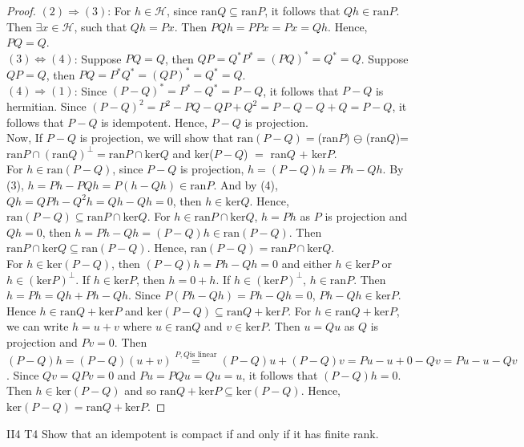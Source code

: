 \begin{proof}
    $(2)\Rightarrow (3)$: 
    For $h\in\mathscr{H}$, since $\text{ran}Q\subseteq \text{ran}P$, 
    it follows that $Qh\in\text{ran}P$. Then $\exists x\in \mathscr{H}$, such that $Qh=Px$.
    Then $PQh=PPx=Px=Qh$. Hence, $PQ=Q$.\\
    $(3)\Leftrightarrow (4)$:
    Suppose $PQ=Q$, then $QP=Q^*P^*=(PQ)^*=Q^*=Q$. 
    Suppose $QP=Q$, then $PQ=P^*Q^*=(QP)^*=Q^*=Q$.\\
    $(4)\Rightarrow (1)$:
    Since $(P-Q)^*=P^*-Q^*=P-Q$, it follows that $P-Q$ is hermitian.
    Since $(P-Q)^2=P^2-PQ-QP+Q^2=P-Q-Q+Q=P-Q$, it follows that $P-Q$ is idempotent.
    Hence, $P-Q$ is projection.\\
    Now, If $P-Q$ is projection, we will show that $\text{ran}(P-Q)=$(ran$P$) $\ominus$ (ran$Q$)=$\text{ran}P\cap (\text{ran}Q)^{\perp}=\text{ran}P\cap \text{ker}Q$
    and ker($P-Q$) $=$ ran$Q$ $+$ ker$P$.\\
    For $h\in \text{ran}(P-Q)$, since $P-Q$ is projection, $h=(P-Q)h=Ph-Qh$.
    By (3), $h=Ph-PQh=P(h-Qh)\in\text{ran}P$. And by (4), $Qh=QPh-Q^2h=Qh-Qh=0$, then $h\in\text{ker}Q$.
    Hence, $\text{ran}(P-Q)\subseteq \text{ran}P\cap \text{ker}Q$.
    For $h\in \text{ran}P\cap \text{ker}Q$, $h=Ph$ as $P$ is projection 
    and $Qh=0$, then $h=Ph-Qh=(P-Q)h\in\text{ran}(P-Q)$. Then $\text{ran}P\cap \text{ker}Q\subseteq \text{ran}(P-Q)$.
    Hence, $\text{ran}(P-Q)=\text{ran}P\cap \text{ker}Q$.\\
    For $h\in\text{ker}(P-Q)$, 
    then $(P-Q)h=Ph-Qh=0$ and either $h\in\text{ker}P$ or $h\in (\text{ker}P)^{\perp}$.
    If $h\in \text{ker}P$, then $h=0+h$. If $h\in (\text{ker}P)^{\perp}$, $h\in \text{ran}P$.
    Then $h=Ph=Qh+Ph-Qh$. Since $P(Ph-Qh)=Ph-Qh=0$, $Ph-Qh\in\text{ker}P$.
    Hence $h\in\text{ran}Q+\text{ker}P$ and $\text{ker}(P-Q)\subseteq \text{ran}Q+\text{ker}P$.
    For $h\in \text{ran}Q + \text{ker}P$, we can write $h=u+v$ where $u\in\text{ran}Q$ and $v\in\text{ker}P$.
    Then $u=Qu$ as $Q$ is projection and $Pv=0$.
    Then $(P-Q)h=(P-Q)(u+v)\overset{P,Q \text{is linear}}{=}(P-Q)u+(P-Q)v=Pu-u+0-Qv=Pu-u-Qv$.
    Since $Qv=QPv=0$ and $Pu=PQu=Qu=u$, it follows that $(P-Q)h=0$.
    Then $h\in\text{ker}(P-Q)$ and so $\text{ran}Q+\text{ker}P\subseteq \text{ker}(P-Q)$.
    Hence, $\text{ker}(P-Q)=\text{ran}Q+\text{ker}P$.

\end{proof}

\begin{exercise}{II4 T4}{}
    Show that an idempotent is compact if and only if it has finite rank.
\end{exercise}

